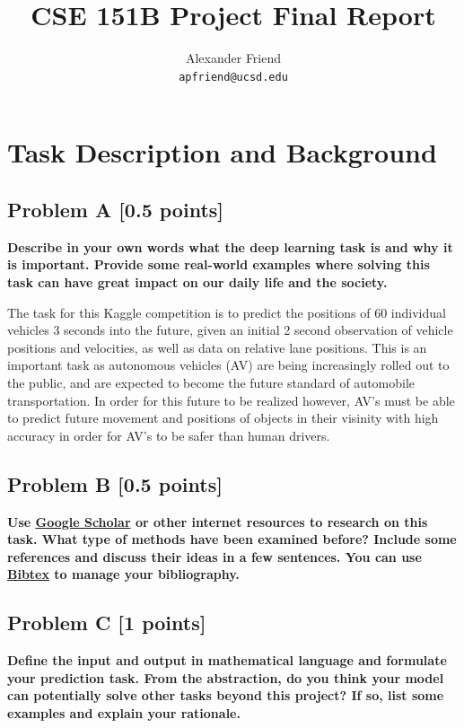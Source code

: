 \documentclass{article}
\title{CSE 151B Project Final Report}
\author{%
  Alexander Friend \\
  \texttt{apfriend@ucsd.edu} \\
}
\begin{document}
  \maketitle
  \section{Task Description and Background}
    \subsection{Problem A [0.5 points]}        
      \textbf{Describe in your own words what the deep learning task is and
      why it is important. Provide some real-world examples where solving this task can have
      great impact on our daily life and the society.}

      The task for this Kaggle competition is to predict the positions of 60 individual 
      vehicles 3 seconds into the future, given an initial 2 second observation of vehicle positions and velocities, as
      well as data on relative lane positions. This is 
      an important task as autonomous vehicles (AV) are being increasingly rolled out to the public,
      and are expected to become the future standard of automobile transportation. In order 
      for this future to be realized however, AV's must be able to predict future movement and positions
      of objects in their visinity with high accuracy in order for AV's to be safer than human drivers.
    
    \subsection{Problem B [0.5 points]}
      \textbf{Use \href{https://scholar.google.com/}{Google Scholar} or other internet resources to research on
      this task. What type of methods have been examined before? Include some references and
      discuss their ideas in a few sentences. You can use 
      \href{https://www.overleaf.com/learn/latex/Bibliography_management_with_bibtex}{Bibtex} 
      to manage your bibliography.}

    \subsection{Problem C [1 points]}
      \textbf{Define the input and output in mathematical language and formulate your prediction task. 
      From the abstraction, do you think your model can potentially
      solve other tasks beyond this project? If so, list some examples and explain your rationale.}
              
\end{document}
